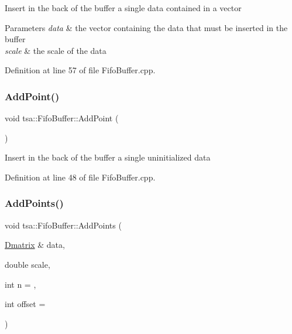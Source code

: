 Insert in the back of the buffer a single data contained in a vector


\begin{DoxyParams}{Parameters}
{\em data} & the vector containing the data that must be inserted in the buffer \\
\hline
{\em scale} & the scale of the data \\
\hline
\end{DoxyParams}


Definition at line 57 of file Fifo\+Buffer.\+cpp.

\mbox{\label{classtsa_1_1_fifo_buffer_a5cec8568b62047b4fb5b19c3fb44d28b}} 
\subsubsection{\texorpdfstring{Add\+Point()}{AddPoint()}\hspace{0.1cm}{\footnotesize\ttfamily [2/2]}}
{\footnotesize\ttfamily void tsa\+::\+Fifo\+Buffer\+::\+Add\+Point (\begin{DoxyParamCaption}{ }\end{DoxyParamCaption})}

Insert in the back of the buffer a single uninitialized data 

Definition at line 48 of file Fifo\+Buffer.\+cpp.

\mbox{\label{classtsa_1_1_fifo_buffer_ab70c4b3ba1a5356ab5384cd7f8638b0d}} 
\subsubsection{\texorpdfstring{Add\+Points()}{AddPoints()}}
{\footnotesize\ttfamily void tsa\+::\+Fifo\+Buffer\+::\+Add\+Points (\begin{DoxyParamCaption}\item[{\hyperlink{namespacetsa_ad260cd21c1891c4ed391fe788569aba4}{Dmatrix} \&}]{data,  }\item[{double}]{scale,  }\item[{int}]{n = {},  }\item[{int}]{offset = {} }\end{DoxyParamCaption})}

